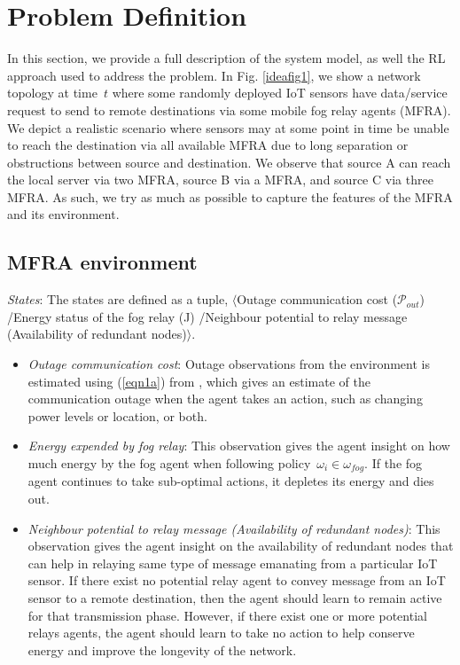\documentclass[journal]{IEEEtran}
\begin{document}
\section{Problem Definition}
In this section, we provide a full description of the system model, as well the RL approach used to address the problem. In Fig. \ref{ideafig1}, we show a network topology at time~$t$ where some randomly deployed IoT sensors have data/service request to send to remote destinations via some mobile fog relay agents (MFRA). We depict a realistic scenario where sensors may at some point in time be unable to reach the destination via all available MFRA due to long separation or obstructions between source and destination. We observe that source A can reach the local server via two MFRA, source B via a MFRA, and source C via three MFRA. As such, we try as much as possible to capture the features of the MFRA and its environment.

\subsection{MFRA environment}
\emph{States}: The states are defined as a tuple, $\langle$Outage communication cost ($\mathcal{P}_{out}$) /Energy status of the fog relay (J) /Neighbour potential to relay message (Availability of redundant nodes)$\rangle$.

\begin{itemize}
  \item \emph{Outage communication cost}: Outage observations from the environment is estimated using (\ref{eqn1a}) from \cite{OmoniwaRelay2018}, which gives an estimate of the communication outage when the agent takes an action, such as changing power levels or location, or both.
  \item \emph{Energy expended by fog relay}: This observation gives the agent insight on how much energy by the fog agent when following policy~$\omega_i \in \omega_{fog}$. If the fog agent continues to take sub-optimal actions, it depletes its energy and dies out.
  \item \emph{Neighbour potential to relay message (Availability of redundant nodes)}: This observation gives the agent insight on the availability of redundant nodes that can help in relaying same type of message emanating from a particular IoT sensor. If there exist no potential relay agent to convey message from an IoT sensor to a remote destination, then the agent should learn to remain active for that transmission phase. However, if there exist one or more potential relays agents, the agent should learn to take no action to help conserve energy and improve the longevity of the network.
\end{itemize}
\end{document}
